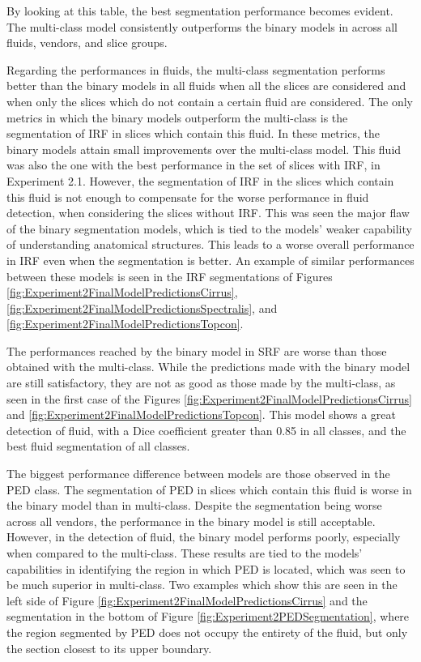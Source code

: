 By looking at this table, the best segmentation performance becomes evident. The multi-class model consistently outperforms the binary models in across all fluids, vendors, and slice groups.
\par
Regarding the performances in fluids, the multi-class segmentation performs better than the binary models in all fluids when all the slices are considered and when only the slices which do not contain a certain fluid are considered. The only metrics in which the binary models outperform the multi-class is the segmentation of IRF in slices which contain this fluid. In these metrics, the binary models attain small improvements over the multi-class model. This fluid was also the one with the best performance in the set of slices with IRF, in Experiment 2.1. However, the segmentation of IRF in the slices which contain this fluid is not enough to compensate for the worse performance in fluid detection, when considering the slices without IRF. This was seen the major flaw of the binary segmentation models, which is tied to the models' weaker capability of understanding anatomical structures. This leads to a worse overall performance in IRF even when the segmentation is better. An example of similar performances between these models is seen in the IRF segmentations of Figures \ref{fig:Experiment2FinalModelPredictionsCirrus}, \ref{fig:Experiment2FinalModelPredictionsSpectralis}, and \ref{fig:Experiment2FinalModelPredictionsTopcon}.
\par
The performances reached by the binary model in SRF are worse than those obtained with the multi-class. While the predictions made with the binary model are still satisfactory, they are not as good as those made by the multi-class, as seen in the first case of the Figures \ref{fig:Experiment2FinalModelPredictionsCirrus} and \ref{fig:Experiment2FinalModelPredictionsTopcon}. This model shows a great detection of fluid, with a Dice coefficient greater than 0.85 in all classes, and the best fluid segmentation of all classes.
\par
The biggest performance difference between models are those observed in the PED class. The segmentation of PED in slices which contain this fluid is worse in the binary model than in multi-class. Despite the segmentation being worse across all vendors, the performance in the binary model is still acceptable. However, in the detection of fluid, the binary model performs poorly, especially when compared to the multi-class. These results are tied to the models' capabilities in identifying the region in which PED is located, which was seen to be much superior in multi-class. Two examples which show this are seen in the left side of Figure \ref{fig:Experiment2FinalModelPredictionsCirrus} and the segmentation in the bottom of Figure \ref{fig:Experiment2PEDSegmentation}, where the region segmented by PED does not occupy the entirety of the fluid, but only the section closest to its upper boundary.
